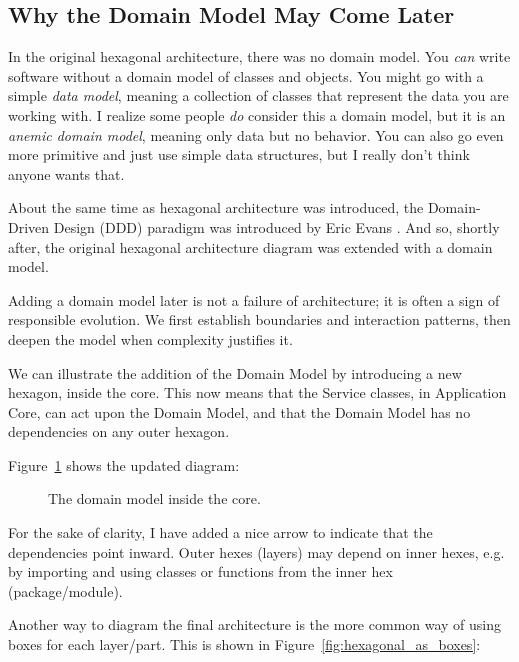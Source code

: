 \subsection{Why the Domain Model May Come Later}
\label{sec:hexagonal_domain_later}

In the original hexagonal architecture, there was no domain model. You \textit{can} write software without a domain model of classes and objects. You might go with a simple \textit{data model}, meaning a collection of classes that represent the data you are working with. I realize some people \textit{do} consider this a domain model, but it is an \textit{anemic domain model}, meaning only data but no behavior. You can also go even more primitive and just use simple data structures, but I really don't think anyone wants that.

About the same time as hexagonal architecture was introduced, the Domain-Driven Design (DDD) paradigm was introduced by Eric Evans \autocite{evans2003ddd}. And so, shortly after, the original hexagonal architecture diagram was extended with a domain model.

Adding a domain model later is not a failure of architecture; it is often a sign of responsible evolution. We first establish boundaries and interaction patterns, then deepen the model when complexity justifies it.

We can illustrate the addition of the Domain Model by introducing a new hexagon, inside the core. This now means that the Service classes, in Application Core, can act upon the Domain Model, and that the Domain Model has no dependencies on any outer hexagon.

Figure~\ref{fig:hexagonal_with_domain} shows the updated diagram:

\begin{figure}[htbp]
    \centering
    \resizebox{0.6\textwidth}{!}{%
        
    }
    \caption{The domain model inside the core.}
    \label{fig:hexagonal_with_domain}
\end{figure}

For the sake of clarity, I have added a nice arrow to indicate that the dependencies point inward. Outer hexes (layers) may depend on inner hexes, e.g. by importing and using classes or functions from the inner hex (package/module).

Another way to diagram the final architecture is the more common way of using boxes for each layer/part. This is shown in Figure~\ref{fig:hexagonal_as_boxes}:

